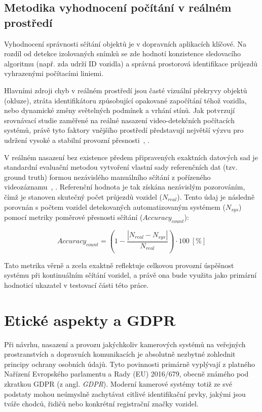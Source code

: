 \documentclass[male,czech,api_bc]{kitheses}
\begin{document}
\subsection{Metodika vyhodnocení počítání v reálném prostředí}
Vyhodnocení správnosti sčítání objektů je v dopravních aplikacích klíčové. Na rozdíl od detekce izolovaných snímků se zde hodnotí konzistence sledovacího algoritmu (např. zda udrží ID vozidla) a správná prostorová identifikace průjezdů vyhrazenými počítacími liniemi. 

Hlavními zdroji chyb v reálném prostředí jsou časté vizuální překryvy objektů (okluze), ztráta identifikátoru způsobující opakované započítání téhož vozidla, nebo dynamické změny světelných podmínek a vrhání stínů. Jak potvrzují srovnávací studie zaměřené na reálné nasazení video-detekčních počítacích systémů, právě tyto faktory vnějšího prostředí představují největší výzvu pro udržení vysoké a stabilní provozní přesnosti~\cite{zhou_traffic_survey_2024}, \cite{pronello_2023}.

V reálném nasazení bez existence předem připravených exaktních datových sad je standardní evaluační metodou vytvoření vlastní sady referenčních dat (tzv. ground truth) formou nezávislého manuálního sčítání z pořízeného videozáznamu~\cite{mdpi_roi_tracking_2022}, \cite{pronello_2023}. Referenční hodnota je tak získána nezávislým pozorováním, čímž je stanoven skutečný počet průjezdů vozidel ($N_{real}$). Tento údaj je následně porovnán s počtem vozidel detekovaných automatizovaným systémem ($N_{sys}$) pomocí metriky poměrové přesnosti sčítání ($Accuracy_{count}$):

$$Accuracy_{count} = \left( 1 - \frac{|N_{real} - N_{sys}|}{N_{real}} \right) \cdot 100 \ [\%]$$

Tato metrika věrně a zcela exaktně reflektuje celkovou provozní úspěšnost systému při kontinuálním sčítání vozidel, a právě ona bude využita jako primární hodnoticí ukazatel v testovací části této práce.

\section{Etické aspekty a GDPR}
Při návrhu, nasazení a provozu jakýchkoliv kamerových systémů na veřejných prostranstvích a dopravních komunikacích je absolutně nezbytné zohlednit principy ochrany osobních údajů. Tyto povinnosti primárně vyplývají z platného Nařízení Evropského parlamentu a Rady (EU) 2016/679, obecně známého pod zkratkou \acs{GDPR} (z angl. \textit{\acl{GDPR}}). Moderní kamerové systémy totiž ze své podstaty mohou neúmyslně zachytávat citlivé identifikační prvky, jakými jsou tváře chodců, řidičů nebo konkrétní registrační značky vozidel.
\end{document}
